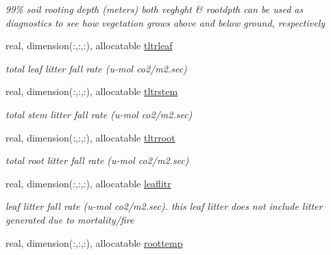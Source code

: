 \begin{DoxyCompactItemize}
\begin{DoxyCompactList}\small\item\em 99\% soil rooting depth (meters) both veghght \& rootdpth can be used as diagnostics to see how vegetation grows above and below ground, respectively \end{DoxyCompactList}\item 
\hypertarget{structctem__statevars_1_1veg__rot_a60d20cf31661802f383a51f465ece718}{}real, dimension(\+:,\+:,\+:), allocatable \hyperlink{structctem__statevars_1_1veg__rot_a60d20cf31661802f383a51f465ece718}{tltrleaf}\label{structctem__statevars_1_1veg__rot_a60d20cf31661802f383a51f465ece718}

\begin{DoxyCompactList}\small\item\em total leaf litter fall rate (u-\/mol co2/m2.\+sec) \end{DoxyCompactList}\item 
\hypertarget{structctem__statevars_1_1veg__rot_a67f5a639fec3f01d8536e003d740e285}{}real, dimension(\+:,\+:,\+:), allocatable \hyperlink{structctem__statevars_1_1veg__rot_a67f5a639fec3f01d8536e003d740e285}{tltrstem}\label{structctem__statevars_1_1veg__rot_a67f5a639fec3f01d8536e003d740e285}

\begin{DoxyCompactList}\small\item\em total stem litter fall rate (u-\/mol co2/m2.\+sec) \end{DoxyCompactList}\item 
\hypertarget{structctem__statevars_1_1veg__rot_ab593e63b0b75d4724f08a88eb474f5b6}{}real, dimension(\+:,\+:,\+:), allocatable \hyperlink{structctem__statevars_1_1veg__rot_ab593e63b0b75d4724f08a88eb474f5b6}{tltrroot}\label{structctem__statevars_1_1veg__rot_ab593e63b0b75d4724f08a88eb474f5b6}

\begin{DoxyCompactList}\small\item\em total root litter fall rate (u-\/mol co2/m2.\+sec) \end{DoxyCompactList}\item 
\hypertarget{structctem__statevars_1_1veg__rot_ab2740dee9ed3bc2684ecf0da3c5c4e10}{}real, dimension(\+:,\+:,\+:), allocatable \hyperlink{structctem__statevars_1_1veg__rot_ab2740dee9ed3bc2684ecf0da3c5c4e10}{leaflitr}\label{structctem__statevars_1_1veg__rot_ab2740dee9ed3bc2684ecf0da3c5c4e10}

\begin{DoxyCompactList}\small\item\em leaf litter fall rate (u-\/mol co2/m2.\+sec). this leaf litter does not include litter generated due to mortality/fire \end{DoxyCompactList}\item 
\hypertarget{structctem__statevars_1_1veg__rot_a90345321ead82718836e53077b2cf3d9}{}real, dimension(\+:,\+:,\+:), allocatable \hyperlink{structctem__statevars_1_1veg__rot_a90345321ead82718836e53077b2cf3d9}{roottemp}\label{structctem__statevars_1_1veg__rot_a90345321ead82718836e53077b2cf3d9}


\end{DoxyCompactItemize}
